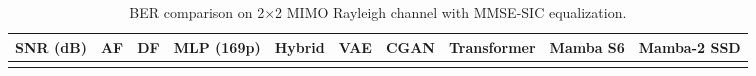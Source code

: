 \documentclass[
  english,
  12pt,
  12pt,
  a4paper,
  oneside]{report}
\begin{document}
\begin{longtable}[]{@{}
  >{\raggedright\arraybackslash}p{}
  >{\raggedright\arraybackslash}p{}
  >{\raggedright\arraybackslash}p{}
  >{\raggedright\arraybackslash}p{}
  >{\raggedright\arraybackslash}p{}
  >{\raggedright\arraybackslash}p{}
  >{\raggedright\arraybackslash}p{}
  >{\raggedright\arraybackslash}p{}
  >{\raggedright\arraybackslash}p{}
  >{\raggedright\arraybackslash}p{}@{}}
\caption{BER comparison on 2×2 MIMO Rayleigh channel with MMSE-SIC equalization.}\label{tbl:table6}\tabularnewline
\toprule\noalign{}
\begin{minipage}[b]{\linewidth}\raggedright
SNR (dB)
\end{minipage} & \begin{minipage}[b]{\linewidth}\raggedright
AF
\end{minipage} & \begin{minipage}[b]{\linewidth}\raggedright
DF
\end{minipage} & \begin{minipage}[b]{\linewidth}\raggedright
MLP (169p)
\end{minipage} & \begin{minipage}[b]{\linewidth}\raggedright
Hybrid
\end{minipage} & \begin{minipage}[b]{\linewidth}\raggedright
VAE
\end{minipage} & \begin{minipage}[b]{\linewidth}\raggedright
CGAN
\end{minipage} & \begin{minipage}[b]{\linewidth}\raggedright
Transformer
\end{minipage} & \begin{minipage}[b]{\linewidth}\raggedright
Mamba S6
\end{minipage} & \begin{minipage}[b]{\linewidth}\raggedright
Mamba-2 SSD
\end{minipage} \\
\midrule\noalign{}
\endfirsthead
\toprule\noalign{}
\begin{minipage}[b]{\linewidth}\raggedright

\end{minipage}
\end{longtable}
\end{document}
